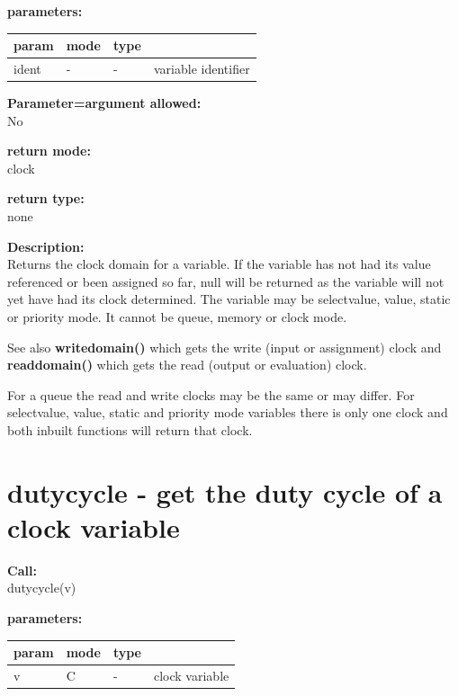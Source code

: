         {\bf parameters:} \\
        \begin{tabular}{| l | l | l | l |}
        \hline
        param  & mode & type & \\
        \hline \hline
        ident & - &  -  & variable identifier \\ \hline
        \end{tabular}
        
        {\bf Parameter=argument allowed:} \\
        No
        
        {\bf return mode:} \\
        clock

        {\bf return type:} \\
        none
        
        {\bf Description:} \\
        Returns the clock domain for a variable. If the variable has not had
        its value referenced or been assigned so far, null will be returned as
        the variable will not yet have had its clock determined. The variable
        may be selectvalue, value, static or priority mode. It cannot be queue,
        memory or clock mode.
        
        See also {\bf writedomain()}  which gets the write
        (input or assignment) clock and {\bf readdomain()}  which
        gets the read (output or evaluation) clock.
        
        For a queue the read and write clocks may be the same or may differ.
        For selectvalue, value, static and priority mode variables there is only
        one clock and both inbuilt functions will return that clock.


    \section{dutycycle - get the duty cycle of a clock variable}\label{sec:ifdutycycle}
        
        {\bf Call:} \\
        dutycycle(v)
        
        {\bf parameters:} \\
        \begin{tabular}{| l | l | l | l |}
        \hline
        param  & mode & type & \\
        \hline \hline
        v & C & - & clock variable \\ \hline
        \end{tabular}
        
